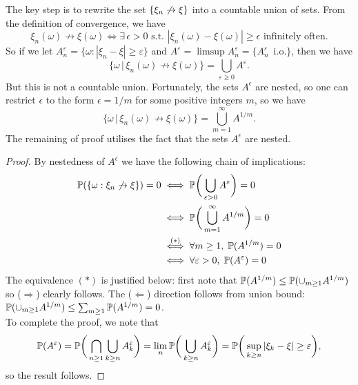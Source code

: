 \begin{hint}
The key step is to rewrite the set $\left\{ \xi_n \not\to \xi \right \}$ into a countable union of sets. From the definition of convergence, we have
$$\xi_n(\omega) \not\to \xi(\omega) \iff \exists \, \epsilon > 0 \text{ s.t. } |\xi_n(\omega) - \xi(\omega)| \geq \epsilon \text{ infinitely often.}$$
So if we let $A_n^\varepsilon= \{ \omega: |\xi_n - \xi| \ge \varepsilon\}$ and $A^\varepsilon= \limsup A_n^\varepsilon= \{A_n^\varepsilon\, \text{ i.o.} \}$, then we have 
$$\{\omega \,|\, \xi_n(\omega) \not \to \xi(\omega) \} = \bigcup_{\varepsilon \ge 0} A^\varepsilon.$$
But this is not a countable union. Fortunately, the sets $A^\epsilon$ are nested, so one can restrict $\epsilon$ to the form $\epsilon = 1/m$ for some positive integers $m$, so we have
\begin{equation*}
\{\omega \,|\, \xi_n(\omega) \not \to \xi(\omega) \} =  \bigcup_{m=1}^\infty A^{1/m}.
\end{equation*}
The remaining of proof utilises the fact that the sets $A^\epsilon$ are nested.
\end{hint}

\begin{proof}
By nestedness of $A^\epsilon$ we have the following chain of implications:
\begin{align*}
    \mathbb{P}(\left\{ \omega: \xi_n \not \to \xi \right \}) = 0 
    &\iff \mathbb{P} \bigg( \bigcup_{\varepsilon > 0} A^\varepsilon \bigg) = 0\\
    &\iff \mathbb{P} \bigg( \bigcup_{m=1}^\infty A^{1/m} \bigg) = 0\\
    &\overset{(*)}{\iff} \forall m \geq 1, \; \mathbb{P}(A^{1/m}) = 0\\
    &\iff \forall \varepsilon > 0, \; \mathbb{P}(A^\varepsilon) = 0
\end{align*}
The equivalence $(*)$ is justified below: first note that $\mathbb{P}(A^{1/m}) \leq \mathbb{P}(\cup_{m\geq 1} A^{1/m})$ so ($\Rightarrow$) clearly follows. The ($\Leftarrow$) direction follows from union bound: $\mathbb{P}(\cup_{m\geq 1} A^{1/m}) \leq \sum_{m\geq 1} \mathbb{P}(A^{1/m}) = 0$.\\

To complete the proof, we note that
\begin{equation*}
    \mathbb{P}(A^\varepsilon) = \mathbb{P} \bigg( \bigcap_{n \geq 1} \bigcup_{k \ge n} A_k^\varepsilon \bigg) = \lim_n \mathbb{P} \bigg( \bigcup_{k \ge n} A_k^\varepsilon \bigg) = \mathbb{P}\bigg(\sup_{k \ge n}|\xi_k - \xi| \ge \varepsilon \bigg),
\end{equation*}
so the result follows.
\end{proof}

